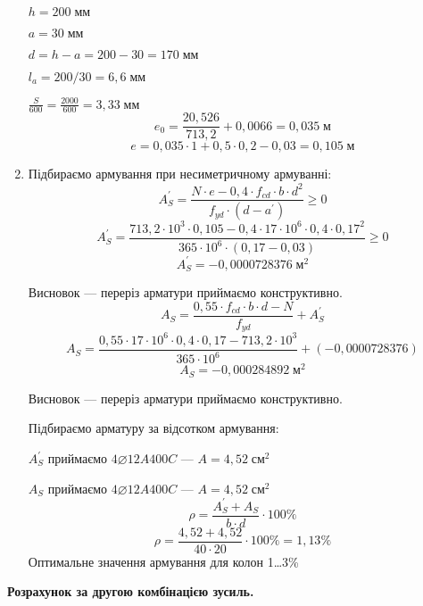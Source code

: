 \documentclass[a4paper,14pt]{article}
\begin{document}
\begin{enumerate}
        $h = 200\;\textit{мм}$

        $a = 30\;\textit{мм}$

        $d = h - a = 200 - 30 = 170\;\textit{мм}$

        $l_a = 200 / 30 = 6,6\;\textit{мм}$

        $\frac{S}{600} = \frac{2000}{600} = 3,33\;\textit{мм}$
        $$e_0 = \frac{20,526}{713,2} + 0,0066 = 0,035\;\textit{м}$$
        $$e = 0,035 \cdot 1 +  0,5 \cdot 0,2 - 0,03 = 0,105\;\textit{м}$$
    \item Підбираємо армування при несиметричному армуванні:
        \begin{equation}
            A_S^\prime = \frac{N \cdot e - 0,4 \cdot f_{cd} \cdot b \cdot d^2}{f_{yd} \cdot (d - a^\prime)} \geqslant 0
        \end{equation}
        $$A_S^\prime = \frac{713,2 \cdot 10^3 \cdot 0,105 - 0,4 \cdot 17 \cdot 10^6 \cdot 0,4 \cdot 0,17^2}{365 \cdot 10^6 \cdot (0,17 - 0,03)} \geqslant 0$$
        $$A_S^\prime = -0,0000728376\;\textit{м}^2$$

        Висновок --- переріз арматури приймаємо конструктивно.
        \begin{equation}
            A_S = \frac{0,55 \cdot f_{cd} \cdot b \cdot d - N}{f_{yd}} + A_S^\prime
        \end{equation}
        $$A_S = \frac{0,55 \cdot 17 \cdot 10^6 \cdot 0,4 \cdot 0,17 - 713,2 \cdot 10^3}{365 \cdot 10^6} +(-0,0000728376)$$
        $$A_S = -0,000284892\;\textit{м}^2$$

        Висновок --- переріз арматури приймаємо конструктивно.

        Підбираємо арматуру за відсотком армування:

        $A_S^\prime$ приймаємо $4\varnothing12A400C$ --- $A = 4,52\;\textit{см}^2$

        $A_S$ приймаємо $4\varnothing12A400C$ --- $A = 4,52\;\textit{см}^2$
        \begin{equation}
            \rho = \frac{A_S^\prime + A_S}{b \cdot d} \cdot 100\%
        \end{equation}
        $$\rho = \frac{4,52 + 4,52}{40 \cdot 20} \cdot 100\% = 1,13\%$$
        Оптимальне значення армування для колон 1\ldots 3\%    
\end{enumerate}
\textbf{Розрахунок за другою комбінацією зусиль.}
\end{document}
